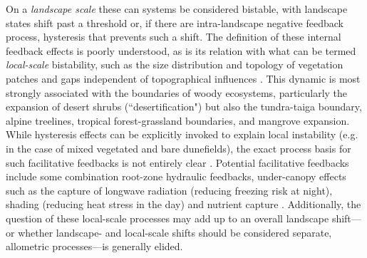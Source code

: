 \documentclass[10pt]{article}
\begin{document}
\begin{linenumbers}
On a \textit{landscape scale} these can systems be considered bistable, with landscape states shift past a threshold or, if there are intra-landscape negative feedback process, hysteresis that prevents such a shift. The definition of these internal feedback effects is poorly understood, as is its relation with what can be termed \textit{local-scale} bistability, such as the size distribution and topology of vegetation patches and gaps independent of topographical influences \citep{Lejeune1999,Rietkerk2004}. This dynamic is most strongly associated with the boundaries of woody ecosystems, particularly the expansion of desert shrubs (``desertification") but also the tundra-taiga boundary, alpine treelines, tropical forest-grassland boundaries, and mangrove expansion. While hysteresis effects can be explicitly invoked to explain local instability (e.g. \citealt{Yizhaq2007} in the case of mixed vegetated and bare dunefields), the exact process basis for such facilitative feedbacks is not entirely clear \citep{Stewart}. Potential facilitative feedbacks include some combination root-zone hydraulic feedbacks, under-canopy effects such as the capture of longwave radiation (reducing freezing risk at night), shading (reducing heat stress in the day) and nutrient capture \citep{Runyan2012,DOdoricoEcotone,DOdorico2013,WangHESS}. Additionally, the question of these local-scale processes may add up to an overall landscape shift---or whether landscape- and local-scale shifts should be considered separate, allometric processes---is generally elided.


\end{linenumbers}
\end{document}
